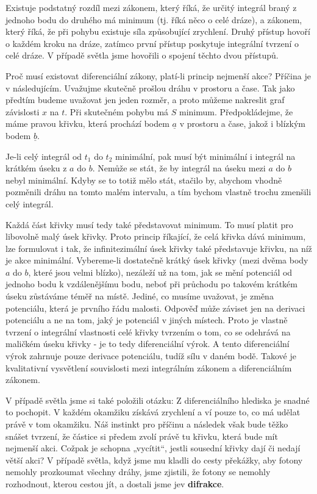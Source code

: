     Existuje podstatný rozdíl mezi zákonem, který říká, že určitý integrál braný z jednoho bodu do
    druhého má minimum (tj. říká něco o celé dráze), a zákonem, který říká, že při pohybu existuje
    síla způsobující zrychlení. Druhý přístup hovoří o každém kroku na dráze, zatímco první přístup
    poskytuje integrální tvrzení o celé dráze. V případě světla jsme hovořili o spojení těchto dvou
    přístupů. 
    
    Proč musí existovat diferenciální zákony, platí-li princip nejmenší akce? Příčina je v
    následujícím. Uvažujme skutečně prošlou dráhu v prostoru a čase. Tak jako předtím budeme
    uvažovat jen jeden rozměr, a proto můžeme nakreslit graf závislosti \(x\) na \(t\). Při
    skutečném pohybu má \(S\) minimum. Předpokládejme, že máme pravou křivku, která prochází bodem
    \(\underline{a}\) v prostoru a čase, jakož i blízkým bodem \(\underline{b}\).

    Je-li celý integrál od \(t_1\) do \(t_2\) minimální, pak musí být minimální i integrál na
    krátkém úseku z \(a\) do \(b\). Nemůže se stát, že by integrál na úseku mezi \(a\) do \(b\)
    nebyl minimální. Kdyby se to totiž mělo stát, stačilo by, abychom vhodně pozměnili dráhu na
    tomto malém intervalu, a tím bychom vlastně trochu zmenšili celý integrál.

    Každá část křivky musí tedy také představovat minimum. To musí platit pro libovolně malý úsek
    křivky. Proto princip říkající, že celá křivka dává minimum, lze formulovat i tak, že
    infinitezimální úsek křivky také představuje křivku, na níž je akce minimální. Vybereme-li
    dostatečně krátký úsek křivky (mezi dvěma body \(a\) do \(b\), které jsou velmi blízko),
    nezáleží už na tom, jak se mění potenciál od jednoho bodu k vzdálenějšímu bodu, neboť při
    průchodu po takovém krátkém úseku zůstáváme téměř na místě. Jediné, co musíme uvažovat, je změna
    potenciálu, která je prvního řádu malosti. Odpověď může záviset jen na derivaci potenciálu a ne
    na tom, jaký je potenciál v jiných místech. Proto je vlastně tvrzení o integrální vlastnosti
    celé křivky tvrzením o tom, co se odehrává na maličkém úseku křivky - je to tedy diferenciální
    výrok. A tento diferenciální výrok zahrnuje pouze derivace potenciálu, tudíž sílu v daném bodě.
    Takové je kvalitativní vysvětlení souvislosti mezi integrálním zákonem a diferenciálním zákonem.
    
    V případě světla jsme si také položili otázku: \emph{} Z
    diferenciálního hlediska je snadné to pochopit. V každém okamžiku získává zrychlení a ví pouze
    to, co má udělat právě v tom okamžiku. Náš instinkt pro příčinu a následek však bude těžko
    snášet tvrzení, že částice si předem zvolí právě tu křivku, která bude mít nejmenší akci. Cožpak
    je schopna „vycítit“, jestli sousední křivky dají či nedají větší akci? V případě světla, když
    jsme mu kladli do cesty překážky, aby fotony nemohly prozkoumat všechny dráhy, jsme zjistili, že
    fotony se nemohly rozhodnout, kterou cestou jít, a dostali jsme jev \textbf{difrakce}. 
    
